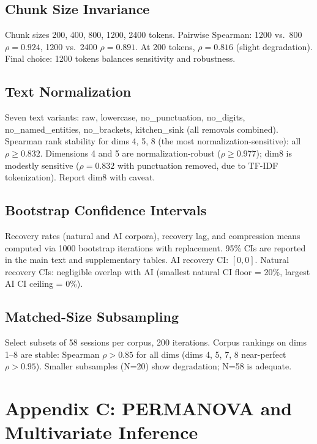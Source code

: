 \documentclass[11pt]{article}
\begin{document}
\subsection{Chunk Size Invariance}

Chunk sizes 200, 400, 800, 1200, 2400 tokens. Pairwise Spearman: 1200 vs.\ 800 $\rho = 0.924$, 1200 vs.\ 2400 $\rho = 0.891$. At 200 tokens, $\rho = 0.816$ (slight degradation). Final choice: 1200 tokens balances sensitivity and robustness.

\subsection{Text Normalization}

Seven text variants: raw, lowercase, no\_punctuation, no\_digits, no\_named\_entities, no\_brackets, kitchen\_sink (all removals combined). Spearman rank stability for dims 4, 5, 8 (the most normalization-sensitive): all $\rho \geq 0.832$. Dimensions 4 and 5 are normalization-robust ($\rho \geq 0.977$); dim8 is modestly sensitive ($\rho = 0.832$ with punctuation removed, due to TF-IDF tokenization). Report dim8 with caveat.

\subsection{Bootstrap Confidence Intervals}

Recovery rates (natural and AI corpora), recovery lag, and compression means computed via 1000 bootstrap iterations with replacement. 95\% CIs are reported in the main text and supplementary tables. AI recovery CI: $[0, 0]$. Natural recovery CIs: negligible overlap with AI (smallest natural CI floor = 20\%, largest AI CI ceiling = 0\%).

\subsection{Matched-Size Subsampling}

Select subsets of 58 sessions per corpus, 200 iterations. Corpus rankings on dims 1--8 are stable: Spearman $\rho > 0.85$ for all dims (dims 4, 5, 7, 8 near-perfect $\rho > 0.95$). Smaller subsamples (N=20) show degradation; N=58 is adequate.

\FloatBarrier

\section{Appendix C: PERMANOVA and Multivariate Inference}
\end{document}
